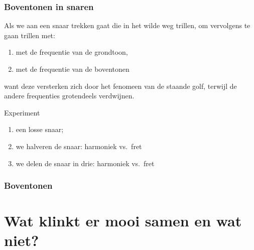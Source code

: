 \documentclass[compress, darktitle, framenumber, totalframenumber]{beamer}
\begin{document}
\begin{frame}
  \frametitle{Boventonen in snaren}

  Als we aan een snaar trekken gaat die in het wilde weg trillen, om vervolgens te gaan trillen met:
  \begin{enumerate}
    \item met de frequentie van de grondtoon,
    \item met de frequentie van de boventonen
  \end{enumerate}
  want deze versterken zich door het fenomeen van de staande golf, terwijl de andere frequenties grotendeels verdwijnen.
  \pause
  \begin{block}{Experiment}
    \begin{enumerate}
      \item een losse snaar;
        \pause
      \item we halveren de snaar: harmoniek vs.\ fret
        \pause
      \item we delen de snaar in drie: harmoniek vs.\ fret
    \end{enumerate}
  \end{block}
\end{frame}

\begin{frame}
  \frametitle{Boventonen}

  \centering
\end{frame}


\section{Wat klinkt er mooi samen en wat niet?}
\end{document}
